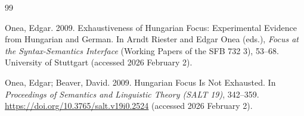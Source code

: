 \documentclass[ruler]{CUP-JNL-LIN}%
\begin{document}
\begin{Backmatter}
\begin{thebibliography}{99}

{Onea, Edgar}. 2009. Exhaustiveness of Hungarian Focus: Experimental Evidence from Hungarian and German. In Arndt Riester and Edgar Onea (eds.), \textit{Focus at the Syntax-Semantics Interface} (Working Papers of the SFB 732 3), 53--68. University of Stuttgart (accessed 2026 February 2).




{Onea, Edgar; Beaver, David}. 2009. Hungarian Focus Is Not Exhausted. In \textit{Proceedings of Semantics and Linguistic Theory (SALT 19)}, 342--359. \url{https://doi.org/10.3765/salt.v19i0.2524} (accessed 2026 February 2).




\end{thebibliography}
\end{Backmatter}
\end{document}
